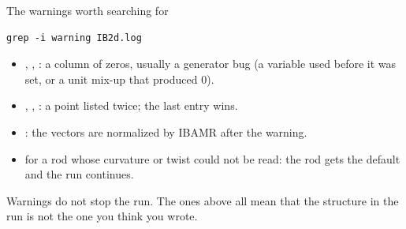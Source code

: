 \documentclass[aspectratio=169,11pt]{beamer}
\begin{document}
\begin{frame}[fragile]{The warnings worth searching for}
\begin{lstlisting}[style=shell]
grep -i warning IB2d.log
\end{lstlisting}
\begin{itemize}
  \item {}, , : a column of zeros, usually a generator bug (a variable used before it was set, or a unit mix-up that produced 0).
  \item {}, , : a point listed twice; the last entry wins.
  \item {}: the  vectors are normalized by IBAMR after the warning.
  \item {} for a rod whose curvature or twist could not be read: the rod gets the default and the run continues.
\end{itemize}
\vspace{2mm}
\begin{punchbox}
\small Warnings do not stop the run. The ones above all mean that the structure in the run is not the one you think you wrote.
\end{punchbox}
\end{frame}
\end{document}
